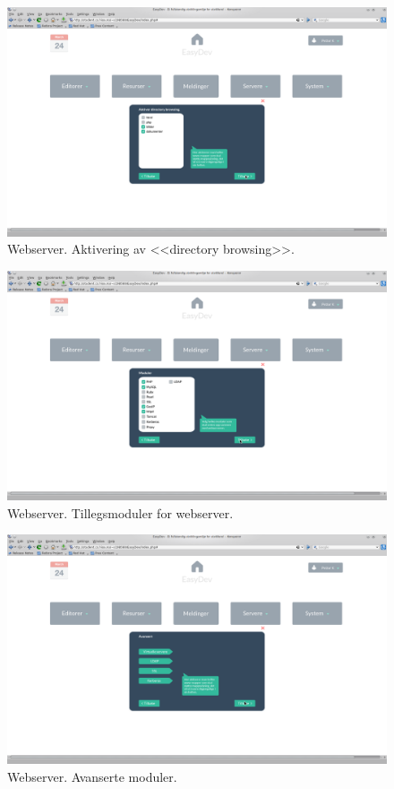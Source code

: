 \begin{figure}[ht]
\includegraphics[width=\textwidth,height=\textheight,keepaspectratio]{./img/prosessdokumentasjon/hifi/a3.png}
\caption[Hi-fi Webserver 3]{Webserver. Aktivering av <<directory browsing>>.}
\label{fig:apachehi3}
\end{figure}

\begin{figure}[ht]
\includegraphics[width=\textwidth,height=\textheight,keepaspectratio]{./img/prosessdokumentasjon/hifi/a4.png}
\caption[Hi-fi Webserver 4]{Webserver. Tillegsmoduler for webserver.}
\label{fig:apachehi4}
\end{figure}

\begin{figure}[ht]
\includegraphics[width=\textwidth,height=\textheight,keepaspectratio]{./img/prosessdokumentasjon/hifi/a5.png}
\caption[Hi-fi Webserver 5]{Webserver. Avanserte moduler.}
\label{fig:apachehi5}
\end{figure}

